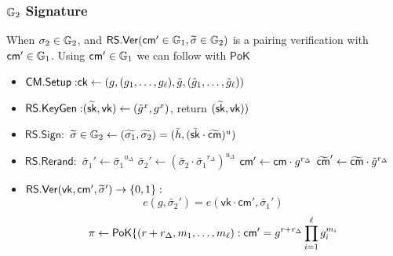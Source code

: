 \subsubsection{$\mathbb{G}_2$ Signature}
\noindent When $\sigma_2 \in \mathbb{G}_2$, and $\mathsf{RS.Ver}(\mathsf{cm}' \in \mathbb{G}_1, \widetilde{\sigma} \in \mathbb{G}_2)$ is a pairing verification with $\mathsf{cm}' \in \mathbb{G}_1$. Using $\mathsf{cm}' \in \mathbb{G}_1$ we can follow with $\mathsf{PoK}$
\begin{itemize}
    \item $\mathsf{CM.Setup:} \mathsf{ck} \gets (g, (g_1,\ldots,g_\ell), \tilde{g}, (\tilde{g}_1,\ldots,\tilde{g}_\ell))$

    \item $\mathsf{RS.KeyGen:} (\widetilde{\mathsf{sk}}, \mathsf{vk}) \gets (\tilde{g}^x, g^x)$, return $(\widetilde{\mathsf{sk}}, \mathsf{vk}))$
    
    \item $\mathsf{RS.Sign:}$ $\widetilde{\sigma} \in \mathbb{G}_2 \gets (\widetilde{\sigma_1}, \widetilde{\sigma_2}) = (\tilde{h}, (\tilde{\mathsf{sk}} \cdot \widetilde{\mathsf{cm}})^u)$
    
    \item $\mathsf{RS.Rerand:}$ \qquad $\widetilde{\sigma_1}' \gets \widetilde{\sigma_1}^{u_\Delta}$ \qquad $\widetilde{\sigma_2}' \gets (\widetilde{\sigma_2} \cdot \widetilde{\sigma_1}^{r_\Delta})^{u_\Delta}$ \qquad $\mathsf{cm}' \gets \mathsf{cm} \cdot g^{r_\Delta}$ \qquad  $\widetilde{\mathsf{cm}}' \gets \widetilde{\mathsf{cm}} \cdot \tilde{g}^{r_\Delta}$
    
    \item $\mathsf{RS.Ver}(\mathsf{vk}, \mathsf{cm}', \widetilde{\sigma}') \to \{0,1\}:$ 
    \[
    e(g, \widetilde{\sigma_2}') = e(\mathsf{vk} \cdot \mathsf{cm}',\widetilde{\sigma_1}')
    \]
   \[
    \pi \gets \mathsf{PoK}\{(r + r_\Delta, m_1,\ldots,m_\ell): \mathsf{cm}' = g^{r + r_\Delta} \prod_{i=1}^\ell g_i^{m_i}
    \]
\end{itemize}



